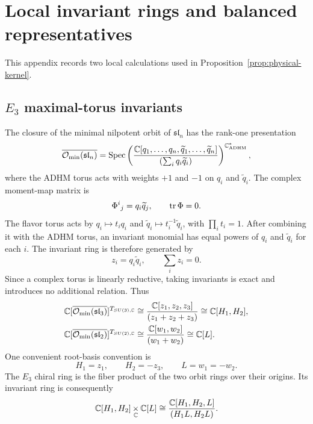 \section{Local invariant rings and balanced representatives}
\label{app:local-algebra}

This appendix records two local calculations used in
Proposition~\ref{prop:physical-kernel}.

\subsection[E3 maximal-torus invariants]{$E_3$ maximal-torus invariants}

The closure of the minimal nilpotent orbit of $\mathfrak{sl}_n$ has the
rank-one presentation
\begin{equation}
 \overline{\mathcal O_{\min}(\mathfrak{sl}_n)}
 =\operatorname{Spec}\left(
 \frac{\mathbb C[q_1,\ldots,q_n,\widetilde q_1,\ldots,\widetilde q_n]}
      {(\sum_iq_i\widetilde q_i)}
 \right)^{\mathbb C^*_{\mathrm{ADHM}}},
 \label{eq:app-adhm}
\end{equation}
where the ADHM torus acts with weights $+1$ and $-1$ on $q_i$ and
$\widetilde q_i$. The complex moment-map matrix is
\begin{equation}
 \Phi^i{}_j=q_i\widetilde q_j,
 \qquad \operatorname{tr}\Phi=0.
\end{equation}
The flavor torus acts by
$q_i\mapsto t_iq_i$ and
$\widetilde q_i\mapsto t_i^{-1}\widetilde q_i$, with $\prod_it_i=1$.
After combining it with the ADHM torus, an invariant monomial has equal powers
of $q_i$ and $\widetilde q_i$ for each $i$. The invariant ring is therefore
generated by
\begin{equation}
 z_i=q_i\widetilde q_i,
 \qquad \sum_i z_i=0.
 \label{eq:app-zi}
\end{equation}
Since a complex torus is linearly reductive, taking invariants is exact and
introduces no additional relation. Thus
\begin{align}
 \mathbb C[\overline{\mathcal O_{\min}(\mathfrak{sl}_3)}]^{T_{SU(3),\mathbb C}}
 &\cong\frac{\mathbb C[z_1,z_2,z_3]}{(z_1+z_2+z_3)}
 \cong\mathbb C[H_1,H_2],\\
 \mathbb C[\overline{\mathcal O_{\min}(\mathfrak{sl}_2)}]^{T_{SU(2),\mathbb C}}
 &\cong\frac{\mathbb C[w_1,w_2]}{(w_1+w_2)}
 \cong\mathbb C[L].
\end{align}
One convenient root-basis convention is
\begin{equation}
 H_1=z_1,
 \qquad H_2=-z_3,
 \qquad L=w_1=-w_2.
 \label{eq:app-root-coordinates}
\end{equation}
The $E_3$ chiral ring is the fiber product of the two orbit rings over their
origins. Its invariant ring is consequently
\begin{equation}
 \mathbb C[H_1,H_2]\mathop{\times}_{\mathbb C}\mathbb C[L]
 \cong\frac{\mathbb C[H_1,H_2,L]}{(H_1L,H_2L)}.
\end{equation}

